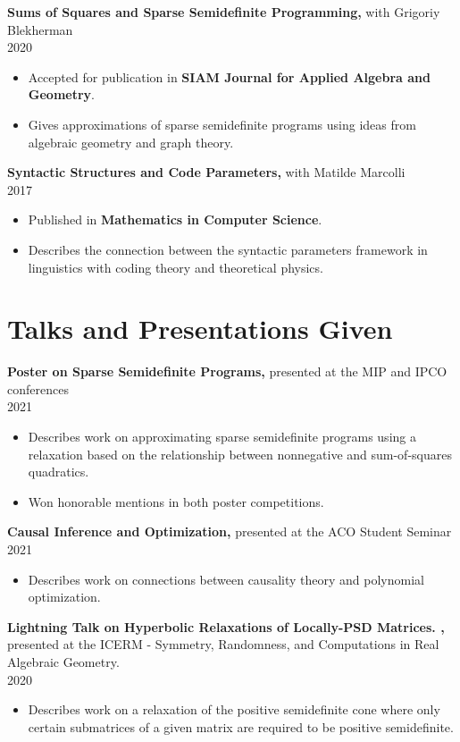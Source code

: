 \documentclass[margin]{res}
\begin{document}
\begin{resume}
\begin{itemize}
\end{itemize}
{\bf   Sums of Squares and Sparse Semidefinite Programming,} with Grigoriy Blekherman \\ 2020
\begin{itemize} \itemsep -2pt %
\item Accepted for publication in \textbf{SIAM Journal for Applied Algebra and Geometry}.
\item Gives approximations of sparse semidefinite programs using ideas from algebraic geometry and graph theory.
\end{itemize}
{\bf  Syntactic Structures and Code Parameters,} with Matilde Marcolli \\ 2017
\begin{itemize} \itemsep -2pt %
\item Published in \textbf{Mathematics in Computer Science}.
\item Describes the connection between the syntactic parameters framework in linguistics with coding theory and theoretical physics.
\end{itemize}


\section{Talks and Presentations Given}


{\bf  Poster on Sparse Semidefinite Programs,} presented at the MIP and IPCO conferences \\ 2021 
\begin{itemize} \itemsep -2pt %
\item Describes work on approximating sparse semidefinite programs using a relaxation based on the relationship between nonnegative and sum-of-squares quadratics.
\item Won honorable mentions in both poster competitions.
\end{itemize}

{\bf  Causal Inference and Optimization,} presented at the ACO Student Seminar \\ 2021
\begin{itemize} \itemsep -2pt %
\item Describes work on connections between causality theory and polynomial optimization.
\end{itemize}

{\bf  Lightning Talk on Hyperbolic Relaxations of Locally-PSD Matrices.
,} 
presented at the ICERM - Symmetry, Randomness, and Computations in Real Algebraic Geometry.
 \\ 2020
\begin{itemize} \itemsep -2pt %
\item Describes work on a relaxation of the positive semidefinite cone where only certain submatrices of a given matrix are required to be positive semidefinite.
\end{itemize}



\end{resume}
\end{document}
